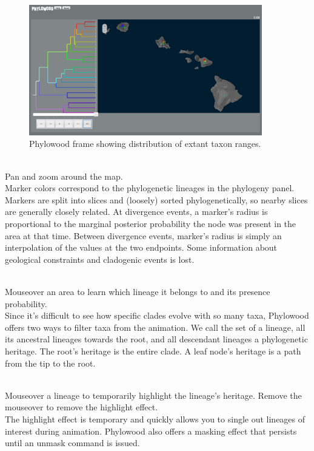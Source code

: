 \begin{figure}[H]
\centering
\includegraphics[width=4in]{figures/phw_all}
\caption{Phylowood frame showing distribution of extant taxon ranges.}
\end{figure}

\noindent \\ \impmark Pan and zoom around the map.\\

Marker colors correspond to the phylogenetic lineages in the phylogeny panel.
Markers are split into slices and (loosely) sorted phylogenetically, so nearby slices are generally closely related.
At divergence events, a marker's radius is proportional to the marginal posterior probability the node was present in the area at that time.
Between divergence events, marker's radius is simply an interpolation of the values at the two endpoints.
Some information about geological constraints and cladogenic events is lost.

\noindent \\ \impmark Mouseover an area to learn which lineage it belongs to and its presence probability. \\

Since it's difficult to see how specific clades evolve with so many taxa, Phylowood offers two ways to filter taxa from the animation.
We call the set of a lineage, all its ancestral lineages towards the root, and all descendant lineages a phylogenetic heritage.
The root's heritage is the entire clade.
A leaf node's heritage is a path from the tip to the root.

\noindent \\ \impmark Mouseover a lineage to temporarily highlight the lineage's heritage. Remove the mouseover to remove the highlight effect. \\

The highlight effect is temporary and quickly allows you to single out lineages of interest during animation.
Phylowood also offers a masking effect that persists until an unmask command is issued.

